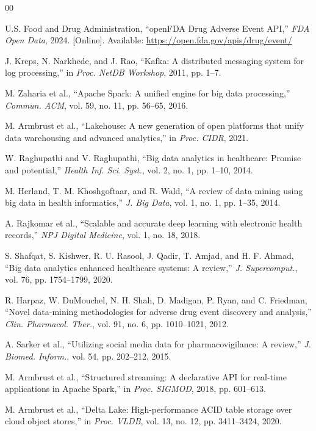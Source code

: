 \documentclass[conference]{IEEEtran}
\begin{document}
\begin{thebibliography}{00}

U.S. Food and Drug Administration, ``openFDA Drug Adverse Event API,'' \textit{FDA Open Data}, 2024. [Online]. Available: \url{https://open.fda.gov/apis/drug/event/}

J. Kreps, N. Narkhede, and J. Rao, ``Kafka: A distributed messaging system for log processing,'' in \textit{Proc. NetDB Workshop}, 2011, pp. 1--7.

M. Zaharia et al., ``Apache Spark: A unified engine for big data processing,'' \textit{Commun. ACM}, vol. 59, no. 11, pp. 56--65, 2016.

M. Armbrust et al., ``Lakehouse: A new generation of open platforms that unify data warehousing and advanced analytics,'' in \textit{Proc. CIDR}, 2021.

W. Raghupathi and V. Raghupathi, ``Big data analytics in healthcare: Promise and potential,'' \textit{Health Inf. Sci. Syst.}, vol. 2, no. 1, pp. 1--10, 2014.

M. Herland, T. M. Khoshgoftaar, and R. Wald, ``A review of data mining using big data in health informatics,'' \textit{J. Big Data}, vol. 1, no. 1, pp. 1--35, 2014.

A. Rajkomar et al., ``Scalable and accurate deep learning with electronic health records,'' \textit{NPJ Digital Medicine}, vol. 1, no. 18, 2018.

S. Shafqat, S. Kishwer, R. U. Rasool, J. Qadir, T. Amjad, and H. F. Ahmad, ``Big data analytics enhanced healthcare systems: A review,'' \textit{J. Supercomput.}, vol. 76, pp. 1754--1799, 2020.

R. Harpaz, W. DuMouchel, N. H. Shah, D. Madigan, P. Ryan, and C. Friedman, ``Novel data-mining methodologies for adverse drug event discovery and analysis,'' \textit{Clin. Pharmacol. Ther.}, vol. 91, no. 6, pp. 1010--1021, 2012.

A. Sarker et al., ``Utilizing social media data for pharmacovigilance: A review,'' \textit{J. Biomed. Inform.}, vol. 54, pp. 202--212, 2015.

M. Armbrust et al., ``Structured streaming: A declarative API for real-time applications in Apache Spark,'' in \textit{Proc. SIGMOD}, 2018, pp. 601--613.

M. Armbrust et al., ``Delta Lake: High-performance ACID table storage over cloud object stores,'' in \textit{Proc. VLDB}, vol. 13, no. 12, pp. 3411--3424, 2020.


\end{thebibliography}
\end{document}
